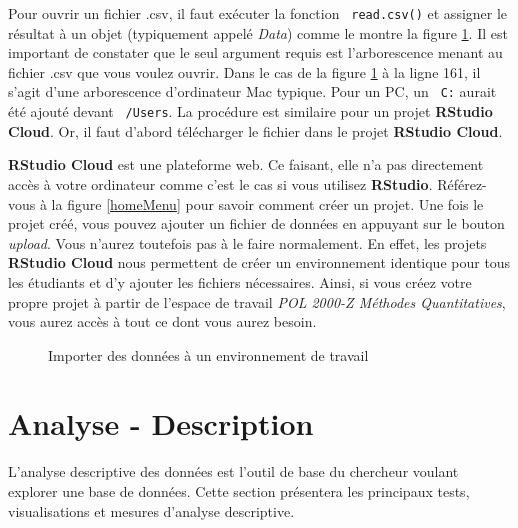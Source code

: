 \documentclass[10.5pt,a4paper]{article}
\newcommand{\rcode}[1]{\texttt{\color{rstudio} #1}}
\begin{document}
  Pour ouvrir un fichier .csv, il faut exécuter la fonction \rcode{read.csv()} et assigner le résultat à un objet (typiquement appelé \emph{Data}) comme le montre la figure \ref{importFig}. Il est important de constater que le seul argument requis est l'arborescence menant au fichier .csv que vous voulez ouvrir. Dans le cas de la figure \ref{importFig} à la ligne 161, il s'agit d'une arborescence d'ordinateur Mac typique. Pour un PC, un \rcode{C:} aurait été ajouté devant \rcode{/Users}. La procédure est similaire pour un projet \textbf{RStudio Cloud}. Or, il faut d'abord télécharger le fichier dans le projet \textbf{RStudio Cloud}.
  
  \textbf{RStudio Cloud} est une plateforme web. Ce faisant, elle n'a pas directement accès à votre ordinateur comme c'est le cas si vous utilisez \textbf{RStudio}. Référez-vous à la figure \ref{homeMenu} pour savoir comment créer un projet. Une fois le projet créé, vous pouvez ajouter un fichier de données en appuyant sur le bouton \textit{upload}. Vous n'aurez toutefois pas à le faire normalement. En effet, les projets \textbf{RStudio Cloud} nous permettent de créer un environnement identique pour tous les étudiants et d'y ajouter les fichiers nécessaires. Ainsi, si vous créez votre propre projet à partir de l'espace de travail \emph{POL 2000-Z Méthodes Quantitatives}, vous aurez accès à tout ce dont vous aurez besoin. 
  
  \begin{figure}[H]
    \centering
    \caption{Importer des données à un environnement de travail}
    \label{importFig}
    \end{figure}

  
\section{Analyse - Description}
L'analyse descriptive des données est l'outil de base du chercheur voulant explorer une base de données. Cette section présentera les principaux tests, visualisations et mesures d'analyse descriptive.
\end{document}
